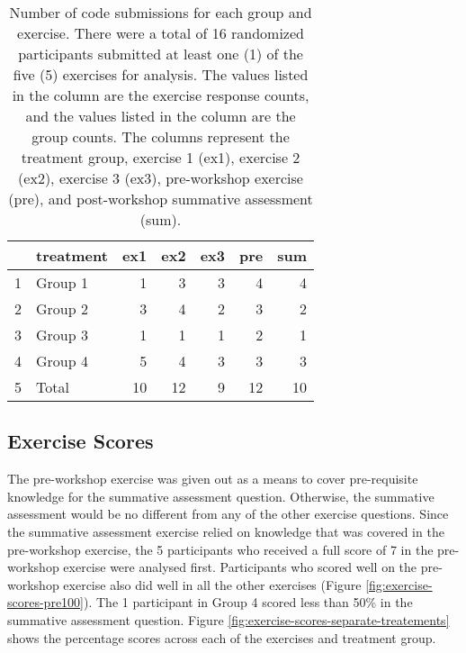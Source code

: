 \documentclass[040-assessment.tex]{subfiles}
\begin{document}
    \begin{table}[ht]
        \centering
        \caption[Number of responses by group and exercise]
        {Number of code submissions for each group and exercise.
         There were a total of 16 randomized participants submitted at least one (1) of the five (5) exercises for analysis.
         The values listed in the  column are the exercise response counts,
         and the values listed in the  column are the group counts.
         The columns represent the
         treatment group,
         exercise 1 (ex1), exercise 2 (ex2), exercise 3 (ex3),
         pre-workshop exercise (pre), and
         post-workshop summative assessment (sum).
        }
        \begin{tabular}{rlrrrrr}
            \hline
           & treatment & ex1 & ex2 & ex3 & pre & sum \\
            \hline
            1 & Group 1 &   1 &   3 &   3 &   4 &   4 \\
            2 & Group 2 &   3 &   4 &   2 &   3 &   2 \\
            3 & Group 3 &   1 &   1 &   1 &   2 &   1 \\
            4 & Group 4 &   5 &   4 &   3 &   3 &   3 \\
            5 & Total &  10 &  12 &   9 &  12 &  10 \\
             \hline
          \end{tabular}
          \label{tab:exercise-treatment-response-counts}
    \end{table}

\subsection{Exercise Scores}

    The pre-workshop exercise was given out as a means to cover pre-requisite knowledge for the
    summative assessment question.
    Otherwise, the summative assessment would be no different from any of the other exercise
    questions.
    Since the summative assessment exercise relied on knowledge that was covered in the
    pre-workshop exercise,
    the 5 participants who received a full score of 7 in the pre-workshop exercise were analysed first.
    Participants who scored well on the pre-workshop exercise also did well in all the other exercises
    (Figure \ref{fig:exercise-scores-pre100}).
    The 1 participant in Group 4 scored less than 50\% in the summative assessment question.
    Figure \ref{fig:exercise-scores-separate-treatements} shows the percentage scores across each
    of the exercises and treatment group.
\end{document}
